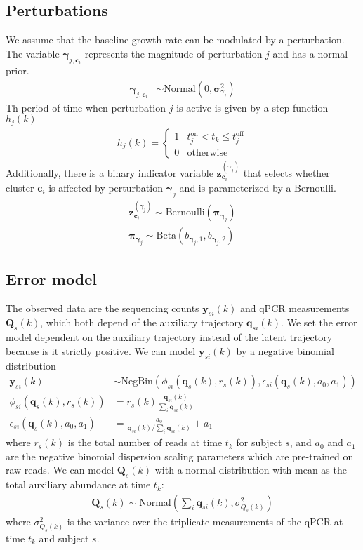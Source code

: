 \documentclass{article}
\newcommand{\Normaldist}{\text{Normal}}
\newcommand{\NegBindist}{\text{NegBin}}
\newcommand{\Betadist}{\text{Beta}}
\newcommand{\Bernoullidist}{\text{Bernoulli}}
\renewcommand{\c}{\mathbf{c}}
\newcommand{\pert}{\mathbf{\gamma}_j}
\newcommand{\pertc}[1]{\mathbf{\gamma}_{j,\c_{#1}}}
\newcommand{\zpertc}[1]{\mathbf{z}^{(\gamma_j)}_{\c_{#1}}}
\newcommand{\varpert}{\mathbf{\sigma}^2_{\gamma_j}}
\newcommand{\pertstep}{h_j}
\newcommand{\probpert}{\mathbf{\pi}_{\pert}}
\newcommand{\q}[2]{\mathbf{q}_{#2}(#1)}
\newcommand{\Q}{\mathbf{Q}}
\newcommand{\y}[2]{\mathbf{y}_{#2}(#1)}
\newcommand{\varQ}[1]{\sigma^2_{Q_s(#1)}}
\begin{document}
\subsection{Perturbations}
We assume that the baseline growth rate can be modulated by a perturbation. The variable $\pertc{i}$ represents the magnitude of perturbation $j$ and has a normal prior.
\begin{align}
  \pertc{i} & \sim \Normaldist (0, \varpert)
\end{align}
Th period of time when perturbation $j$ is active is given by a step function $\pertstep(k)$
\begin{align}
  \pertstep(k) = \begin{cases}
    1 & t^{\text{on}}_j < t_k \le t^{\text{off}}_j \\
    0 & \text{otherwise}
  \end{cases}
\end{align}
Additionally, there is a binary indicator variable $\zpertc{i}$ that selects whether cluster $\c_i$ is affected by perturbation $\pert$ and is parameterized by a Bernoulli.
\begin{align}
  \zpertc{i} \sim \Bernoullidist (\probpert) \\
  \probpert \sim \Betadist (b_{\pert,1}, b_{\pert,2})
\end{align}

\subsection{Error model}
\label{subsection:error model}
The observed data are the sequencing counts $\y{k}{si}$ and qPCR measurements $\Q_s(k)$, which both depend of the auxiliary trajectory $\q{k}{si}$. We set the error model dependent on the auxiliary trajectory instead of the latent trajectory because is it strictly positive. We can model $\y{k}{si}$ by a negative binomial distribution \cite{cite:negbin}
\begin{align}
  \label{eqn:negbin}
  \y{k}{si} & \sim \NegBindist (\phi_{si} (\q{k}{s}, r_s(k)), \epsilon_{si} (\q{k}{s},a_0,a_1)) \\
  \phi_{si} (\q{k}{s}, r_s(k)) & = r_s(k) \frac{\q{k}{si}}{\sum_i \q{k}{si}} \\
  \epsilon_{si} (\q{k}{s},a_0,a_1) & = \frac{a_0}{\q{k}{si}/\sum_i \q{k}{si}} + a_1
\end{align}
where $r_s(k)$ is the total number of reads at time $t_k$ for subject $s$, and $a_0$ and $a_1$ are the negative binomial dispersion scaling parameters which are pre-trained on raw reads. We can model $\Q_s(k)$ with a normal distribution with mean as the total auxiliary abundance at time $t_k$:
\begin{align}
  \Q_s(k) \sim \Normaldist (\sum_i \q{k}{si}, \varQ{k})
\end{align}
where $\varQ{k}$ is the variance over the triplicate measurements of the qPCR at time $t_k$ and subject $s$.
\end{document}
